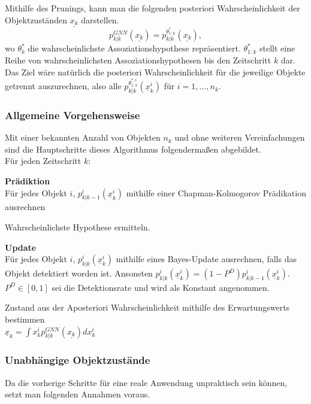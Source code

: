 \documentclass[10pt,a4paper]{article}
\begin{document}
Mithilfe des Prunings, kann man die folgenden posteriori Wahrscheinlichkeit der Objektzuständen $\underline{x_k}$ darstellen.
\begin{equation}
p_{k|k}^{GNN}(\underline{x_k}) = p_{k|k}^{\theta^*_{1:k}}(\underline{x_k}),
\end{equation} 
wo $\theta_k^*$ die wahrscheinlichste Assoziationshypothese repräsentiert. $\theta^*_{1:k}$ stellt eine Reihe von wahrscheinlichsten Assoziationshypothesen bis den Zeitschritt $k$ dar. Das Ziel wäre natürlich die posteriori Wahrscheinlichkeit für die jeweilige Objekte getrennt auszurechnen, also alle $p_{k|k}^{\theta^{*,i}_{1:k}}(\underline{x}_k^i)$ für $i = 1,...,n_k$.
\subsubsection{Allgemeine Vorgehensweise }
Mit einer bekannten Anzahl von Objekten $n_k$ und ohne weiteren Vereinfachungen sind die Hauptschritte dieses Algorithmus folgendermaßen abgebildet.\\
Für jeden Zeitschritt $k$:\\
\begin{steps}\label{Stp:basicStepsGNN}
  \item \textbf{Prädiktion}\\
  Für jedes Objekt $i$, $p_{k|k-1}^{i}(\underline{x}_k^i)$  mithilfe einer Chapman-Kolmogorov Prädikation ausrechnen
  \item Wahrscheinlichste Hypothese ermitteln.
  \item \textbf{Update}\\
   Für jedes Objekt $i$, $p_{k|k}^{i}(\underline{x}_k^i)$  mithilfe eines Bayes-Update ausrechnen, falls das Objekt detektiert worden ist. Ansonsten  $p_{k|k}^{i}(\underline{x}_k^i) = (1-P^D)p_{k|k-1}^{i}(\underline{x}_k^i)$. $P^D \in [0,1]$ sei die Detektionsrate und wird als Konstant angenommen.
   \item\label{step:erwartungsWert} Zustand aus der Aposteriori Wahrscheinlichkeit mithilfe des Erwartungswerts bestimmen \\
   $\underline{x}_k =  \int x_k^i p_{k|k}^{GNN}(\underline{x_k}) dx_k^i$
  
\end{steps}

\subsubsection{Unabhängige Objektzustände}
Da die vorherige Schritte für eine reale Anwendung unpraktisch sein können, setzt man folgenden Annahmen voraus.
\end{document}
